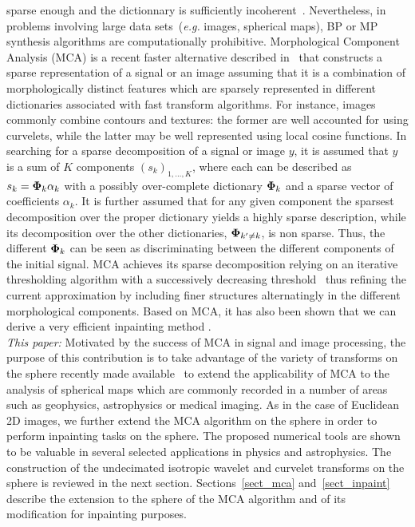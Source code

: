 sparse enough and the dictionnary is sufficiently incoherent~\cite{Donoho-Elad,cur:elad02,miki:Gribonval-Nielsen,miki:Temlyakov,miki:fuchs}. 
Nevertheless, in problems involving large data sets~(\emph{e.g.} images, spherical maps), 
BP or MP synthesis algorithms are computationally prohibitive.
%
Morphological Component Analysis (MCA) is a recent faster alternative described in~\cite{starck:sta04} 
that  constructs a sparse representation of a signal or an image assuming that it is a combination 
of morphologically distinct features which are sparsely represented in different dictionaries 
associated with fast transform algorithms. For instance, images commonly combine contours and textures: 
the former are well accounted for using curvelets, while the latter may be well represented using 
local cosine functions. In searching for a sparse decomposition of a signal or image $y$, it is 
assumed that $y$ is a sum of $K$ components $ (s_k)_{1,\ldots,K}$, where each can be described as 
$s_k = {\bf \Phi}_k \alpha_k$ with a possibly over-complete dictionary ${\bf \Phi}_k$ and a sparse 
vector of coefficients $\alpha_k$. It is further assumed that for any given component the sparsest 
decomposition over the proper dictionary yields a highly sparse description, while its decomposition 
over the other dictionaries, ${\bf \Phi}_{k'\ne k}$, is non sparse. Thus, the different ${\bf \Phi}_k$ 
can be seen as discriminating between the different components of the initial signal. MCA achieves its 
sparse decomposition relying on an iterative thresholding algorithm with a successively decreasing 
threshold~\cite{starck:bobin06_tip} thus refining the current approximation by including finer structures 
alternatingly in the different morphological components. Based on MCA, it has also been shown that we can 
derive a very efficient inpainting method \cite{starck:elad05}.\\
%
{\em This paper: } Motivated by the success of MCA in signal and image processing, the purpose of this contribution 
is to take advantage of the variety of transforms on the sphere recently made available~\cite{starck:sta05_2} to extend 
the applicability of MCA to the analysis of spherical maps which are commonly recorded in a number of areas such as 
geophysics, astrophysics or medical imaging. As in the case of Euclidean 2D images, we further extend the MCA algorithm 
on the sphere in order to perform inpainting tasks on the sphere. The proposed numerical tools are shown to be valuable 
in several selected applications in physics and astrophysics. The construction of the undecimated isotropic wavelet and 
curvelet transforms on the sphere is reviewed in the next section. Sections~\ref{sect_mca} and~\ref{sect_inpaint} describe 
the extension to the sphere of the MCA algorithm and of its modification for inpainting purposes. 


